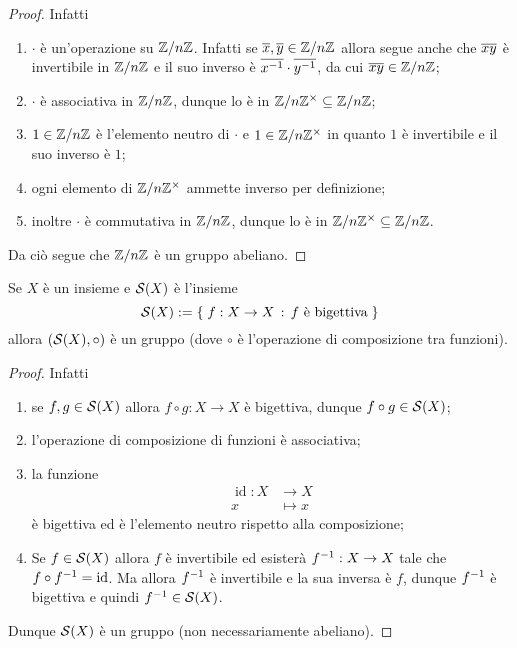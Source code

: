 \begin{proof}
    Infatti \begin{enumerate}[label={(G\arabic*)}, start=0]
        \item $\cdot$ è un'operazione su $\mathbb{Z}/n\mathbb{Z}$. Infatti se $\eqclass x, \eqclass y \in \Zmod{n}$ allora segue anche che $\eqclass{xy}$ è invertibile in $\mathbb{Z}/n\mathbb{Z}$ e il suo inverso è $\eqclass{x\inv} \cdot \eqclass{y\inv}$, da cui $\eqclass{xy} \in \Zmod n$;
        \item $\cdot$ è associativa in $\mathbb{Z}/n\mathbb{Z}$, dunque lo è in $\mathbb{Z}/n\mathbb{Z}^{\times} \subseteq \mathbb{Z}/n\mathbb{Z}$;
        \item $1 \in \mathbb{Z}/n\mathbb{Z}$ è l'elemento neutro di $\cdot$ e $1 \in \mathbb{Z}/n\mathbb{Z}^{\times}$ in quanto $1$ è invertibile e il suo inverso è $1$;
        \item ogni elemento di $\mathbb{Z}/n\mathbb{Z}^{\times}$ ammette inverso per definizione;
        \item inoltre $\cdot$ è commutativa in $\mathbb{Z}/n\mathbb{Z}$, dunque lo è in $\mathbb{Z}/n\mathbb{Z}^{\times} \subseteq \mathbb{Z}/n\mathbb{Z}$.
    \end{enumerate}
    Da ciò segue che $\mathbb{Z}/n\mathbb{Z}$ è un gruppo abeliano.
\end{proof}
\begin{example}
    Se $X$ è un insieme e $\mathcal{S}(X)$ è l'insieme \[
        \mathcal{S}(X) := \left\{\;f : X \to X \,:\, f \text{ è bigettiva}\;\right\}    
    \] allora $(\mathcal{S}(X), \circ)$ è un gruppo (dove $\circ$ è l'operazione di composizione tra funzioni).
\end{example}
\begin{proof}
    Infatti \begin{enumerate}[label={(G\arabic*)}, start=0]
        \item se $f, g \in \mathcal{S}(X)$ allora $f \circ g : X \to X$ è bigettiva, dunque $f \circ g \in \mathcal{S}(X)$;
        \item l'operazione di composizione di funzioni è associativa;
        \item la funzione \begin{align*}
            \operatorname{id} : X &\to X\\
            x &\mapsto x
        \end{align*} è bigettiva ed è l'elemento neutro rispetto alla composizione;
        \item Se $f \in \mathcal{S}(X)$ allora $f$ è invertibile ed esisterà $f^{-1} : X \to X$ tale che $f \circ f^{-1} = \operatorname{id}$. Ma allora $f^{-1}$ è invertibile e la sua inversa è $f$, dunque $f^{-1}$ è bigettiva e quindi $f^{-1} \in \mathcal{S}(X)$.
    \end{enumerate}
    Dunque $\mathcal{S}(X)$ è un gruppo (non necessariamente abeliano).
\end{proof}


